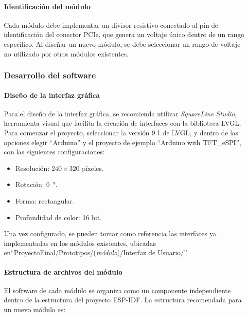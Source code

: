 \paragraph{Identificación del módulo}

Cada módulo debe implementar un divisor resistivo conectado al pin de identificación del conector PCIe, que genera un voltaje único dentro de un rango específico. Al diseñar un nuevo módulo, se debe seleccionar un rango de voltaje no utilizado por otros módulos existentes.

\subsubsection{Desarrollo del software}

\paragraph{Diseño de la interfaz gráfica}

Para el diseño de la interfaz gráfica, se recomienda utilizar \textit{SquareLine Studio}, herramienta visual que facilita la creación de interfaces con la biblioteca LVGL. Para comenzar el proyecto, seleccionar la versión 9.1 de LVGL, y dentro de las opciones elegir ``Arduino'' y el proyecto de ejemplo ``Arduino with TFT\_eSPI'', con las siguientes configuraciones:

\begin{itemize}[noitemsep]
    \item Resolución: $240\times320$ píxeles.
    \item Rotación: \SI{0}{\degree}.
    \item Forma: rectangular.
    \item Profundidad de color: 16 bit.
\end{itemize}

Una vez configurado, se pueden tomar como referencia las interfaces ya implementadas en los módulos existentes, ubicadas en``ProyectoFinal/Prototipos/(\textit{módulo})/Interfaz de Usuario/''.

\paragraph{Estructura de archivos del módulo}

El software de cada módulo se organiza como un componente independiente dentro de la estructura del proyecto ESP-IDF. La estructura recomendada para un nuevo módulo es:

